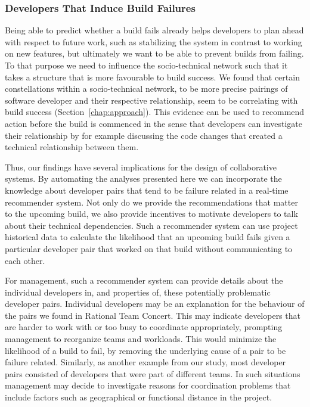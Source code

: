 \subsubsection{Developers That Induce Build Failures}
\label{sec:implications}
Being able to predict whether a build fails already helps developers to plan ahead with respect to future work, such as stabilizing the system in contrast to working on new features, but ultimately we want to be able to prevent builds from failing.
To that purpose we need to influence the socio-technical network such that it takes a structure that is more favourable to build success.
We found that certain constellations within a socio-technical network, to be more precise pairings of software developer and their respective relationship, seem to be correlating with build success (Section~\ref{chap:approach}).
This evidence can be used to recommend action before the build is commenced in the sense that developers can investigate their relationship by for example discussing the code changes that created a technical relationship between them.

Thus, our findings have several implications for the design of collaborative systems.
By automating the analyses presented here we can incorporate the knowledge about
developer pairs that tend to be failure related in a real-time recommender
system. Not only do we provide the recommendations that matter to the upcoming
build, we also provide incentives to motivate developers to talk about their
technical dependencies. 
Such a recommender system can use project historical data to
calculate the likelihood that an upcoming build fails given a particular
developer pair that worked on that build without communicating to each other.

For management, such a recommender system can provide details about the
individual developers in, and properties of, these potentially problematic
developer pairs. Individual developers may be an explanation for the behaviour of
the pairs we found in Rational Team Concert. This may indicate developers that are
harder to work with or too busy to coordinate appropriately, prompting management
to reorganize teams and workloads. This would minimize the likelihood of a build
to fail, by removing the underlying cause of a pair to be failure related.
Similarly, as another example from our study, most developer pairs
consisted of developers that were part of different teams. In such
situations management may decide to investigate reasons for coordination
problems that include factors such as geographical or functional distance in the project.

